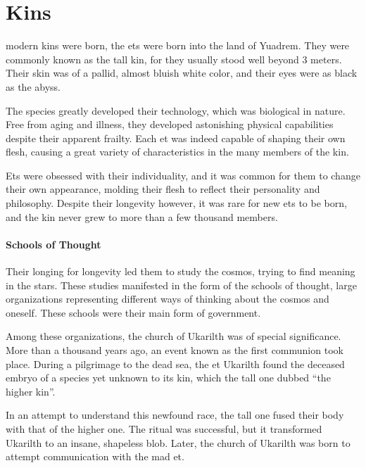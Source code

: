 \chapter{Kins} \label{ch::kins}
modern kins were born, the ets were born into the land of Yuadrem.
They were commonly known as the tall kin, for they usually stood well beyond 3 meters.
Their skin was of a pallid, almost bluish white color, and their eyes were as black as the abyss.

The species greatly developed their technology, which was biological in nature.
Free from aging and illness, they developed astonishing physical capabilities despite their apparent frailty.
Each et was indeed capable of shaping their own flesh, causing a great variety of characteristics in the many members of the kin.

Ets were obsessed with their individuality, and it was common for them to change their own appearance, molding their flesh to reflect their personality and philosophy.
Despite their longevity however, it was rare for new ets to be born, and the kin never grew to more than a few thousand members.

\subsubsection{Schools of Thought}
Their longing for longevity led them to study the cosmos, trying to find meaning in the stars.
These studies manifested in the form of the schools of thought, large organizations representing different ways of thinking about the cosmos and oneself.
These schools were their main form of government.%

Among these organizations, the church of Ukarilth was of special significance.
More than a thousand years ago, an event known as the first communion took place.
During a pilgrimage to the dead sea, the et Ukarilth found the deceased embryo of a species yet unknown to its kin, which the tall one dubbed ``the higher kin''.

In an attempt to understand this newfound race, the tall one fused their body with that of the higher one.
The ritual was successful, but it transformed Ukarilth to an insane, shapeless blob.
Later, the church of Ukarilth was born to attempt communication with the mad et.

